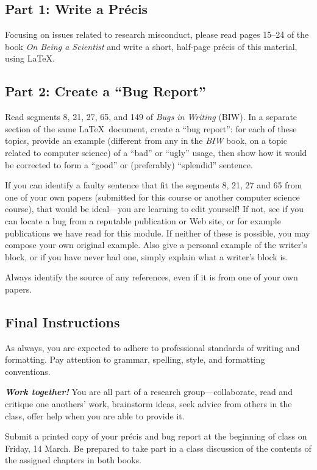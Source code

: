 

\usepackage[compact]{titlesec}




\subsection*{Part 1: Write a Pr\'{e}cis}

Focusing on issues related to research misconduct, please read pages 15--24 of the book {\em On Being a Scientist} and write a short,
half-page pr\'{e}cis of this material, using \LaTeX.

\subsection*{Part 2: Create a ``Bug Report''}
Read segments 8, 21, 27, 65, and 149 of {\em Bugs in Writing} (BIW).
In a separate section of the same \LaTeX\ document, create a
``bug report'': for each
of these topics, provide an example (different from any in the {\em BIW}
book, on a topic
related to computer science) of a ``bad'' or ``ugly'' usage, then show
how it would be corrected to form a ``good'' or (preferably) ``splendid''
sentence.

If you can identify a faulty sentence that fit the segments 8, 21, 27 and 65 from one of your own papers (submitted
for this course or another computer science course), that would be ideal---you
    are learning to edit yourself!
If not, see if you can locate a bug from a reputable publication or
Web site, or for example publications we have read for this module. If neither of these is possible, you may compose your own
original example. Also give a personal example of the writer's block, or if you have never had one, simply explain what a writer's block is.

Always identify the source of any references, even if it is from one of your
own papers.

\subsection*{Final Instructions}
As always,
you are expected to adhere to professional standards of writing and
formatting. Pay attention to grammar, spelling, style, and formatting
conventions.

{\large\color{blue}\textbf{\textit{Work together!}}} You are all part of a research group---collaborate,
read and critique one anothers' work, brainstorm ideas,
seek advice from others in the class, offer help when you are able
to provide it.

Submit a printed copy of your pr\'{e}cis and bug report at the beginning
of class on Friday, 14 March. Be prepared to take part in a
class discussion of the contents of the assigned chapters in both books.

